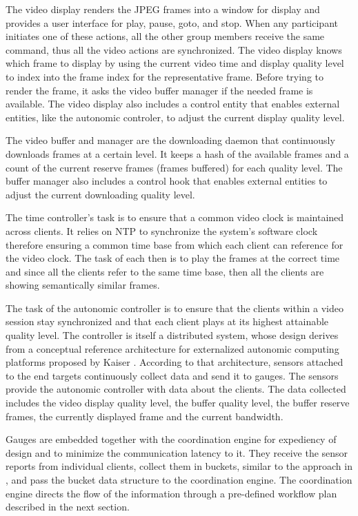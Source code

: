 \documentclass{sig-alternate}
\begin{document}
The video display renders the JPEG frames into a window for display
and provides a user interface for play, pause, goto, and stop.  When
any participant initiates one of these actions, all the other group
members receive the same command, thus all the video actions are
synchronized.  The video display knows which frame to display by using
the current video time and display quality level to index into the
frame index for the representative frame.  Before trying to render the
frame, it asks the video buffer manager if the needed frame is
available.  The video display also includes a control entity that
enables external entities, like the autonomic controler, to adjust the
current display quality level.

The video buffer and manager are the downloading daemon that
continuously downloads frames at a certain level.  It keeps a hash of
the available frames and a count of the current reserve frames (frames
buffered) for each quality level.  The buffer manager also includes a
control hook that enables external entities to adjust the current
downloading quality level.

The time controller's task is to ensure that a common video clock is
maintained across clients.  It relies on NTP \cite{NTP} to synchronize
the system's software clock therefore ensuring a common time base from
which each client can reference for the video clock.  The task of each
then is to play the frames at the correct time and since all the
clients refer to the same time base, then all the clients are showing
semantically similar frames.

The task of the autonomic controller is to ensure that the clients
within a video session stay synchronized and that each client plays at
its highest attainable quality level.  The controller is itself a
distributed system, whose design derives from a conceptual reference
architecture for externalized autonomic computing platforms proposed
by Kaiser \cite{refarch}.
%
%
According to that architecture, sensors attached to the end targets
continuously collect data and send it to gauges.  The sensors provide
the autonomic controller with data about the clients.  The data
collected includes the video display quality level, the buffer quality
level, the buffer reserve frames, the currently displayed frame and
the current bandwidth.  

Gauges are embedded together with the coordination engine for
expediency of design and to minimize the communication latency to it.
They receive the sensor reports from individual clients, collect them
in buckets, similar to the approach in \cite{MIMAZE}, and pass the
bucket data structure to the coordination engine.  The coordination
engine directs the flow of the information through a pre-defined
workflow plan described in the next section.
\end{document}
